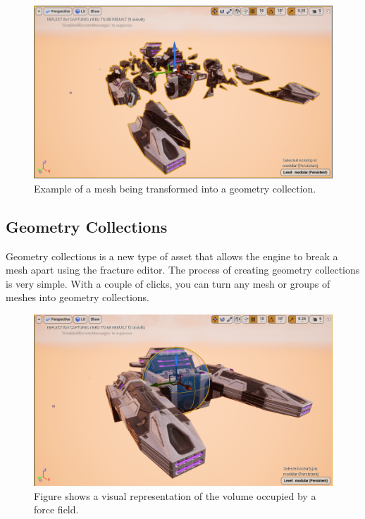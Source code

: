 \documentclass[sigconf]{acmart}
\begin{document}
\begin{figure}
\begin{multicols}{2}
    \includegraphics[width=\linewidth]{aaafiles/3.png}\par
\end{multicols}
\caption{Example of a mesh being transformed into a geometry collection.}
\end{figure}

\subsection{Geometry Collections}

Geometry collections is a new type of asset that allows the engine to break a mesh apart using the fracture editor. The process of creating geometry collections is very simple. With a couple of clicks, you can turn any mesh or groups of meshes into geometry collections.

\begin{figure}[ht]
  \centering
  \includegraphics[width=\linewidth]{aaafiles/force.png}
  \caption{Figure shows a visual representation of the volume occupied by a force field.}
  \label{fig:force}
\end{figure}
\end{document}
